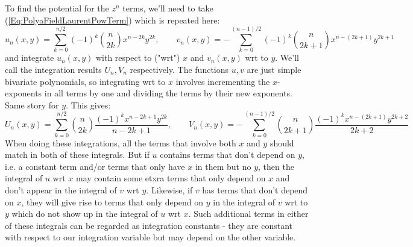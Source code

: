 \documentclass[12pt]{article}
\begin{document}
\medskip
To find the potential for the $z^n$ terms, we'll need to take (\ref{Eq:PolyaFieldLaurentPowTerm}) which is repeated here:
\begin{equation}
u_n(x,y) = \sum_{k=0}^{n/2} (-1)^k \binom{n}{2 k} x^{n-2k} y^{2k}
,\qquad
v_n(x,y) = -\sum_{k=0}^{(n-1)/2} (-1)^k \binom{n}{2k+1} x^{n-(2k+1)} y^{2k+1}
\end{equation}
and integrate $u_n(x,y)$ with respect to ("wrt") $x$ and $v_n(x,y)$ wrt to $y$. We'll call the integration results $U_n, V_n$ respectively. The functions $u,v$ are just simple bivariate polynomials, so integrating wrt to $x$ involves incrementing the $x$-exponents in all terms by one and dividing the terms by their new exponents. Same story for $y$. This gives:
\begin{equation}
U_n(x,y) = \sum_{k=0}^{n/2} \binom{n}{2 k} \frac{(-1)^k x^{n-2k+1} y^{2k}}{n-2k+1}
,\qquad
V_n(x,y) = -\sum_{k=0}^{(n-1)/2} \binom{n}{2k+1} \frac{(-1)^k x^{n-(2k+1)} y^{2k+2}}{2k+2}
\end{equation}
When doing these integrations, all the terms that involve both $x$ and $y$ should match in both of these integrals. But if $u$ contains terms that don't depend on $y$, i.e. a constant term and/or terms that only have $x$ in them but no $y$, then the integral of $u$ wrt $x$ may contain some etxra terms that only depend on $x$ and don't appear in the integral of $v$ wrt $y$. Likewise, if $v$ has terms that don't depend on $x$, they will give rise to terms that only depend on $y$ in the integral of $v$ wrt to $y$ which do not show up in the integral of $u$ wrt $x$. Such additional terms in either of these integrals can be regarded as integration constants - they are constant with respect to our integration variable but may depend on the other variable.
\end{document}
